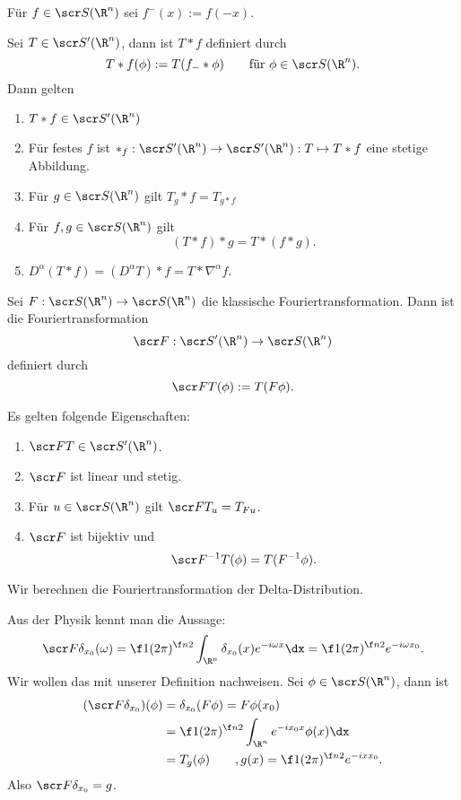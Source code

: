 \begin{st}[Faltung] \label{5.57}
	Für $f \in \scr S(\R^n)$ sei $f^-(x) := f(-x)$.

	Sei $T \in \scr S'(\R^n)$, dann ist $T \ast f$ definiert durch
	\[
		T \ast f(\phi)
		:= T(f_- \ast \phi)
		\qquad \text{für $\phi \in \scr S(\R^n)$.}
	\]
	Dann gelten
	\begin{enumerate}[1)]
		\item
			$T \ast f \in \scr S'(\R^n)$
		\item
			Für festes $f$ ist $\ast_f : \scr S'(\R^n) \to \scr S'(\R^n) : T \mapsto T\ast f$ eine stetige Abbildung.
		\item
			Für $g \in \scr S(\R^n)$ gilt $T_g \ast f = T_{g \ast f}$
		\item
			Für $f,g \in \scr S(\R^n)$ gilt
			\[
				(T \ast f) \ast g = T \ast (f \ast g).
			\]
		\item
			$D^\alpha (T\ast f) = (D^\alpha T) \ast f = T \ast \nabla^\alpha f$.
	\end{enumerate}
\end{st}

\begin{st}[Fouriertransformation] \label{5.58}
	Sei $F : \scr S(\R^n) \to \scr S(\R^n)$ die klassische Fouriertransformation.
	Dann ist die Fouriertransformation
	\[
		\scr F : \scr S'(\R^n) \to \scr S(\R^n)
	\]
	definiert durch
	\[
		\scr F T(\phi) := T(F \phi).
	\]

	Es gelten folgende Eigenschaften:
	\begin{enumerate}[1)]
		\item
			$\scr F T \in \scr S'(\R^n)$.
		\item
			$\scr F$ ist linear und stetig.
		\item
			Für $u \in \scr S(\R^n)$ gilt $\scr F T_u = T_{F u}$.
		\item
			$\scr F$ ist bijektiv und
			\[
				\scr F^{-1} T(\phi) = T(F^{-1} \phi).
			\]
	\end{enumerate}
\end{st}

\begin{ex} \label{5.59}
	Wir berechnen die Fouriertransformation der Delta-Distribution.

	Aus der Physik kennt man die Aussage:
	\begin{align*}
		\scr F \delta_{x_0}(\omega)
		= \f 1{(2\pi)^{\f n2}} \int_{\R^n} \delta_{x_0}(x) e^{-i\omega x} \dx
		= \f 1{(2\pi)^{\f n2}} e^{-i\omega x_0}.
	\end{align*}
	Wir wollen das mit unserer Definition nachweisen.
	Sei $\phi \in \scr S(\R^n)$, dann ist
	\begin{align*}
		(\scr F \delta_{x_0})(\phi)
		&= \delta_{x_0} (F \phi)
		= F \phi(x_0) \\
		&= \f 1{(2\pi)^{\f n2}} \int_{\R^n} e^{-i x_0 x} \phi(x) \dx \\
		&= T_g(\phi) \qquad, g(x) = \f 1{(2\pi)^{\f n2}} e^{-ix x_0}.
	\end{align*}
	Also $\scr F \delta_{x_0} = g$.
\end{ex}

